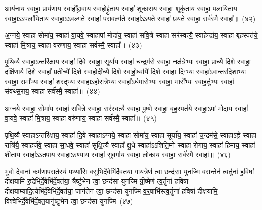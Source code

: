 {\anuvakamend[{रन्तिः॒ स्वाहा॒ द्वाविꣳ॑शतिश्च}]}%

आय॑नाय॒ स्वाहा॒ प्राय॑णाय॒ स्वाहो᳚द्द्रा॒वाय॒ स्वाहोद्द्रु॑ताय॒ स्वाहा॑ शूका॒राय॒ स्वाहा॒ शूकृ॑ताय॒ स्वाहा॒ पला॑यिताय॒ स्वाहा॒\-ऽऽ\-पला॑यिताय॒ स्वाहा॒\-ऽऽ\-वल्ग॑ते॒ स्वाहा॑ परा॒वल्ग॑ते॒ स्वाहा॑\-ऽऽ\-य॒ते स्वाहा᳚ प्रय॒ते स्वाहा॒ सर्व॑स्मै॒ स्वाहा᳚॥~(४२)

{\anuvakamend[{आय॑ना॒योत्त॑रमा॒पला॑यिताय॒ षड्विꣳ॑शतिः}]}%

अ॒ग्नये॒ स्वाहा॒ सोमा॑य॒ स्वाहा॑ वा॒यवे॒ स्वाहा॒पां मोदा॑य॒ स्वाहा॑ सवि॒त्रे स्वाहा॒ सर॑स्वत्यै॒ स्वाहेन्द्रा॑य॒ स्वाहा॒ बृह॒स्पत॑ये॒ स्वाहा॑ मि॒त्राय॒ स्वाहा॒ वरु॑णाय॒ स्वाहा॒ सर्व॑स्मै॒ स्वाहा᳚॥~(४३)

{\anuvakamend[{}]}

पृ॒थि॒व्यै स्वाहा॒\-ऽन्तरि॑क्षाय॒ स्वाहा॑ दि॒वे स्वाहा॒ सूर्या॑य॒ स्वाहा॑ च॒न्द्रम॑से॒ स्वाहा॒ नक्ष॑त्रेभ्यः॒ स्वाहा॒ प्राच्यै॑ दि॒शे स्वाहा॒ दक्षि॑णायै दि॒शे स्वाहा᳚ प्र॒तीच्यै॑ दि॒शे स्वाहोदी᳚च्यै दि॒शे स्वाहो॒र्ध्वायै॑ दि॒शे स्वाहा॑ दि॒ग्भ्यः स्वाहा॑\-ऽ\-वान्तरदि॒शाभ्यः॒ स्वाहा॒ समा᳚भ्यः॒ स्वाहा॑ श॒रद्भ्यः॒ स्वाहा॑\-ऽहोरा॒त्रेभ्यः॒ स्वाहा᳚\-ऽर्धमा॒सेभ्यः॒ स्वाहा॒ मासे᳚भ्यः॒ स्वाह॒र्तुभ्यः॒ स्वाहा॑ संवथ्स॒राय॒ स्वाहा॒ सर्व॑स्मै॒ स्वाहा᳚॥~(४४)

{\anuvakamend[{}]}

अ॒ग्नये॒ स्वाहा॒ सोमा॑य॒ स्वाहा॑ सवि॒त्रे स्वाहा॒ सर॑स्वत्यै॒ स्वाहा॑ पू॒ष्णे स्वाहा॒ बृह॒स्पत॑ये॒ स्वाहा॒\-ऽपां मोदा॑य॒ स्वाहा॑ वा॒यवे॒ स्वाहा॑ मि॒त्राय॒ स्वाहा॒ वरु॑णाय॒ स्वाहा॒ सर्व॑स्मै॒ स्वाहा᳚॥~(४५)

{\anuvakamend[{}]}

पृ॒थि॒व्यै स्वाहा॒\-ऽन्तरि॑क्षाय॒ स्वाहा॑ दि॒वे स्वाहा॒\-ऽग्नये॒ स्वाहा॒ सोमा॑य॒ स्वाहा॒ सूर्या॑य॒ स्वाहा॑ च॒न्द्रम॑से॒ स्वाहा\-ऽह्ने॒ स्वाहा॒ रात्रि॑यै॒ स्वाह॒र्जवे॒ स्वाहा॑ सा॒धवे॒ स्वाहा॑ सुक्षि॒त्यै स्वाहा᳚ क्षु॒धे स्वाहा॑\-ऽऽ\-शिति॒म्ने स्वाहा॒ रोगा॑य॒ स्वाहा॑ हि॒माय॒ स्वाहा॑ शी॒ताय॒ स्वाहा॑\-ऽऽ\-त॒पाय॒ स्वाहा\-ऽर॑ण्याय॒ स्वाहा॑ सुव॒र्गाय॒ स्वाहा॑ लो॒काय॒ स्वाहा॒ सर्व॑स्मै॒ स्वाहा᳚॥~(४६)

{\anuvakamend[{}]}

भुवो॑ दे॒वानां॒ कर्म॑णा॒पस॒र्तस्य॑ प॒थ्या॑सि॒ वसु॑भिर्दे॒वेभि॑र्दे॒वत॑या गाय॒त्रेण॑ त्वा॒ छन्द॑सा युनज्मि वस॒न्तेन॑ त्व॒र्तुना॑ ह॒विषा॑ दीक्षयामि रु॒द्रेभि॑र्दे॒वेभि॑र्दे॒वत॑या॒ त्रैष्टु॑भेन त्वा॒ छन्द॑सा युनज्मि ग्री॒ष्मेण॑ त्व॒र्तुना॑ ह॒विषा॑ दीक्षयाम्यादि॒त्येभि॑\-र्दे॒वेभि॑र्दे॒वत॑या॒ जाग॑तेन त्वा॒ छन्द॑सा युनज्मि व॒र्॒\mbox{}षाभि॑स्त्व॒र्तुना॑ ह॒विषा॑ दीक्षयामि॒ विश्वे॑भिर्दे॒वेभि॑र्दे॒वत॒यानु॑ष्टुभेन त्वा॒ छन्द॑सा युनज्मि~(४७)

